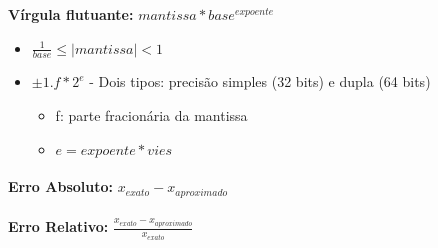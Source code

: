\documentclass[../resumosMNUM.tex]{subfiles}
\begin{document}
 

\textbf{Vírgula flutuante: } \(mantissa*base^{expoente}\)
\begin{itemize}
    \item \(\frac{1}{base} \leq |mantissa| < 1\)
    \item \(\pm 1.f * 2^e\) - Dois tipos: precisão simples (32 bits) e dupla (64 bits)
    \begin{itemize}
        \item f: parte fracionária da mantissa
        \item \(e = expoente * vies\)
    \end{itemize}
\end{itemize}

\paragraph{}
\textbf{Erro Absoluto: } \(x_{exato} - x_{aproximado}\)

\paragraph{}
\textbf{Erro Relativo: } \(\frac{x_{exato} - x_{aproximado}}{x_{exato}}\)
\end{document}
